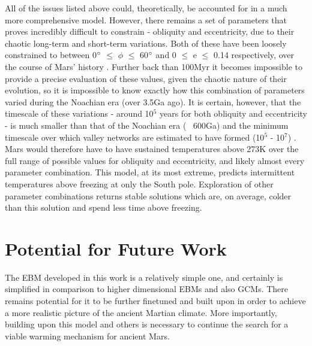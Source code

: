 \documentclass[12pt,onecolumn]{revtex4-2}    %
\begin{document}
All of the issues listed above could, theoretically, be accounted for in a much more comprehensive model. However, there remains a set of parameters that proves incredibly difficult to constrain - obliquity and eccentricity, due to their chaotic long-term and short-term variations. Both of these have been loosely constrained to between 0$\degree$ $\leq$ $\phi$ $\leq$ 60$\degree$ and 0 $\leq$ e $\leq$ 0.14 respectively, over the course of Mars' history \cite{L04}. Further back than 100Myr it becomes impossible to provide a precise evaluation of these values, given the chaotic nature of their evolution, so it is impossible to know exactly how this combination of parameters varied during the Noachian era (over 3.5Ga ago). It is certain, however, that the timescale of these variations - around 10$^5$ years for both obliquity and eccentricity - is much smaller than that of the Noachian era (~ 600Ga) and the minimum timescale over which valley networks are estimated to have formed (10$^5$ - 10$^7$) \cite{HHT11}. Mars would therefore have to have sustained temperatures above 273K over the full range of possible values for obliquity and eccentricity, and likely almost every parameter combination. This model, at its most extreme, predicts intermittent temperatures above freezing at only the South pole. Exploration of other parameter combinations returns stable solutions which are, on average, colder than this solution and spend less time above freezing.

\section{Potential for Future Work}

The EBM developed in this work is a relatively simple one, and certainly is simplified in comparison to higher dimensional EBMs and also GCMs. There remains potential for it to be further finetuned and built upon in order to achieve a more realistic picture of the ancient Martian climate. More importantly, building upon this model and others is necessary to continue the search for a viable warming mechanism for ancient Mars.
	
\
	
\end{document}
